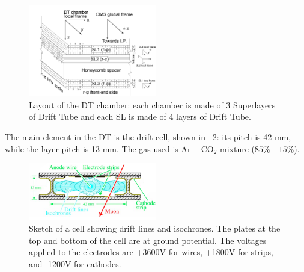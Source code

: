 \begin{figure}[h!]
 \centering
 \includegraphics[width=0.5\textwidth]{Images/DTchamber.png}
 \caption{Layout of the DT chamber: each chamber is made of 3 Superlayers of Drift Tube and each SL is made of 4 layers of Drift Tube.}
\label{DT_chamber}
\end{figure}
The main element in the DT is the drift cell, shown in \figurename~\ref{DT_cell}: its pitch is 42 mm, while the layer pitch is 13 mm. The gas used is $\mathrm{Ar-CO_{2}}$ mixture ($85\%$ - $15\%$).
\begin{figure}[h!]
 \centering
 \includegraphics[width=0.5\textwidth]{Images/DT_cell}
 \caption{Sketch of a cell showing drift lines and isochrones. The plates at the top and bottom of the cell are at ground potential. The voltages applied to the electrodes are +3600V for wires, +1800V for strips, and -1200V for cathodes.}
\label{DT_cell}
\end{figure}

